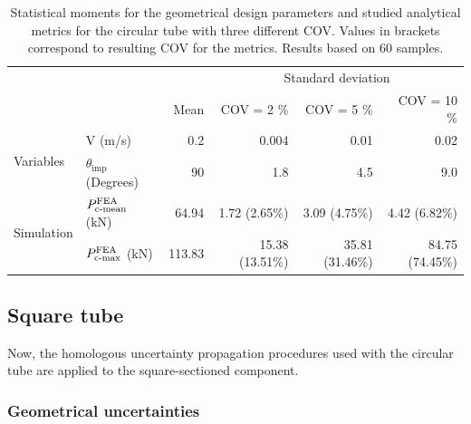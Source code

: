 \documentclass[12pt,number,preprint,review,times]{elsarticle}
\begin{document}
\begin{table}[!htpb]
\begin{center}
\begin{tabular}[t]{llrrrr} \toprule
 & &  &  \multicolumn{3}{c}{Standard deviation}  \\\cmidrule{4-6}
&  & Mean       &    COV = 2 \%  &  COV = 5 \%      &    COV = 10 \%  \\\midrule
\multirow{2}{*}{Variables} & V (m/s)  &  0.2 &  0.004 & 0.01 & 0.02   \\
 & $\theta_{\mathrm{imp}}$ (Degrees) &  90 & 1.8 & 4.5 & 9.0 \\ \midrule
\multirow{2}{*}{Simulation} & $P^{\mathrm{FEA}}_{\mathrm{c{\text -}mean}}$ (kN) &  64.94 & 1.72 (2.65\%) & 3.09 (4.75\%) & 4.42 (6.82\%)  \\
& $P^{\mathrm{FEA}}_{\mathrm{c{\text -}max}}$ (kN) &  113.83  & 15.38 (13.51\%) & 35.81 (31.46\%) & 84.75 (74.45\%) \\
\bottomrule
\end{tabular}
\captionsetup{justification=centering}
\caption{Statistical moments for the geometrical design parameters and studied analytical metrics for the circular tube with three different COV. Values in brackets correspond to resulting COV for the metrics. Results based on 60 samples.}
\label{tab:UQ_circ3}
\end{center}
\end{table}

\subsection{Square tube}

Now, the homologous uncertainty propagation procedures used with the circular tube are applied to the square-sectioned component.
\subsubsection{Geometrical uncertainties}
\end{document}
